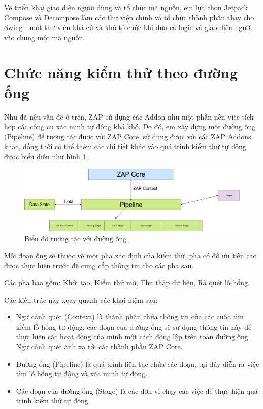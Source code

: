 \documentclass[./../main.tex]{subfiles}
\begin{document}
Về triển khai giao diện người dùng và tổ chức mã nguồn, em lựa chọn
Jetpack Compose và Decompose làm các thư viện chính và tổ chức thành phần
thay cho Swing - một thư viện khá cũ và khó tổ chức khi đưa cả logic và
giao diện người vào chung một mã nguồn.

\section{Chức năng kiểm thử theo đường ống}
Như đã nêu vấn đề ở trên, ZAP sử dụng các Addon như một phần nên việc
tích hợp các công cụ xác minh tự động khá khó. Do đó, em xây dựng một
đường ống (Pipeline) để tương tác được với ZAP Core, sử dụng được với các
ZAP Addons khác, đồng thời có thể thêm các chi tiết khác vào quá trình kiểm
thử tự động được biểu diễn như hình \ref{fig:pipeline_component}.

\begin{figure}[ht!]
	\includegraphics[width=\linewidth]{./images/pipeline_component.png}
	\caption{Biểu đồ tương tác với đường ống}
	\label{fig:pipeline_component}
\end{figure}

Mỗi đoạn ống sẽ thuộc về một pha xác định của kiểm thử, pha có độ ưu tiên
cao được thực hiện trước để cung cấp thông tin cho các pha sau.

Các pha bao gồm: Khởi tạo, Kiểm thử mờ, Thu thập dữ liệu, Rà quét lỗ hổng.

Các kiến trúc này xoay quanh các khai niệm sau:
\begin{itemize}
	\item Ngữ cảnh quét (Context) là thành phần chứa thông tin của các cuộc
	      tìm kiếm lỗ hổng tự động, các đoạn của đường ống sẽ sử dụng thông tin này để thực hiện các hoạt động của mình một cách động lập trên toàn đường ống. Ngữ cảnh quét ánh xạ tới các thành phần ZAP Core.
	\item Đường ống (Pipeline) là quá trình liên tục chứa các đoạn, tại đây
	      diễn ra việc tìm lỗ hổng tự động và xác minh tự động.
	\item Các đoạn của đường ống (Stage) là các đơn vị chạy các việc để thực
	      hiện quá trình kiểm thử tự động.
\end{itemize}
\end{document}
